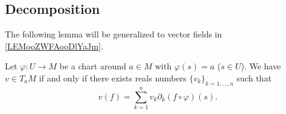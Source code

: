 \subsection{Decomposition}


The following lemma will be generalized to vector fields in \ref{LEMooZWFAooDlYaJm}.
\begin{lemma}       \label{LEMooSCVHooYPiGse}
	Let \( \varphi\colon U\to M\) be a chart around \( a\in M\) with \( \varphi(s)=a\) (\( s\in U\)). We have \( v\in T_aM\) if and only if there exists reals numbers \( \{ v_k \}_{k=1,\ldots, n}\) such that
	\begin{equation}        \label{EQooNEDSooOhyrCZ}
		v(f)=\sum_{k=1}^nv_k\partial_k(f\circ \varphi)(s).
	\end{equation}
\end{lemma}

